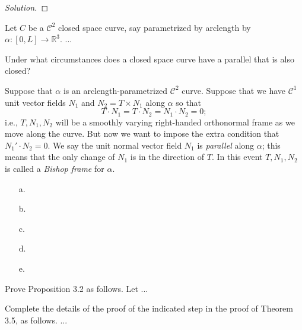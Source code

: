 \documentclass[Shifrin_Solutions_Spring_2018]{subfiles}
\begin{document}
\begin{proof}[Solution]




\end{proof}


\begin{exercise}
Let $C$ be a $\mathcal{C}^2$ closed space curve, say parametrized by arclength by $\alpha: [0,L] \rightarrow \mathbb{R}^3$. ...

\end{exercise}

\begin{exercise}
Under what circumstances does a closed space curve have a parallel that is also closed?
\end{exercise}

\begin{exercise}
Suppose that $\alpha$ is an arclength-parametrized $\mathcal{C}^2$ curve. Suppose that we have $\mathcal{C}^1$ unit vector fields $N_1$ and $N_2 = T\times N_1$ along $\alpha$ so that
\[
T\cdot N_1 = T\cdot N_2 = N_1 \cdot N_2 = 0 ;
\]
i.e., $T, N_1, N_2$ will be a smoothly varying right-handed orthonormal frame as we move along the curve. But now we want to impose the extra condition that $N_1'\cdot N_2 = 0$. We say the unit normal vector field $N_1$ is \emph{parallel} along $\alpha$; this means that the only change of $N_1$ is in the direction of $T$. In this event $T, N_1, N_2$ is called a \emph{Bishop frame} for $\alpha$.
\begin{itemize}
\item[a.]
\item[b.]
\item[c.]
\item[d.]
\item[e.]
\end{itemize}
\end{exercise}

\begin{exercise}
Prove Proposition 3.2 as follows. Let ...

\end{exercise}

\begin{exercise} Complete the details of the proof of the indicated step in the proof of Theorem 3.5, as follows. ...
\end{exercise}
\end{document}
